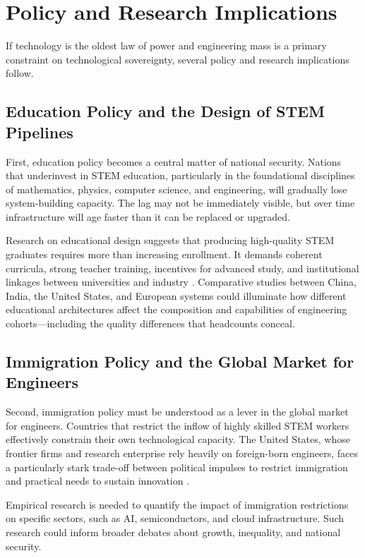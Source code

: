 \documentclass[12pt,letterpaper]{article}
\begin{document}
\section{Policy and Research Implications}
\label{sec:policy}

If technology is the oldest law of power and engineering mass is a primary constraint on technological sovereignty, several policy and research implications follow.

\subsection{Education Policy and the Design of STEM Pipelines}

First, education policy becomes a central matter of national security. Nations that underinvest in STEM education, particularly in the foundational disciplines of mathematics, physics, computer science, and engineering, will gradually lose system-building capacity. The lag may not be immediately visible, but over time infrastructure will age faster than it can be replaced or upgraded.

Research on educational design suggests that producing high-quality STEM graduates requires more than increasing enrollment. It demands coherent curricula, strong teacher training, incentives for advanced study, and institutional linkages between universities and industry \cite{oecd2023}. Comparative studies between China, India, the United States, and European systems could illuminate how different educational architectures affect the composition and capabilities of engineering cohorts---including the quality differences that headcounts conceal.

\subsection{Immigration Policy and the Global Market for Engineers}

Second, immigration policy must be understood as a lever in the global market for engineers. Countries that restrict the inflow of highly skilled STEM workers effectively constrain their own technological capacity. The United States, whose frontier firms and research enterprise rely heavily on foreign-born engineers, faces a particularly stark trade-off between political impulses to restrict immigration and practical needs to sustain innovation \cite{nasem2024}.

Empirical research is needed to quantify the impact of immigration restrictions on specific sectors, such as AI, semiconductors, and cloud infrastructure. Such research could inform broader debates about growth, inequality, and national security.
\end{document}
